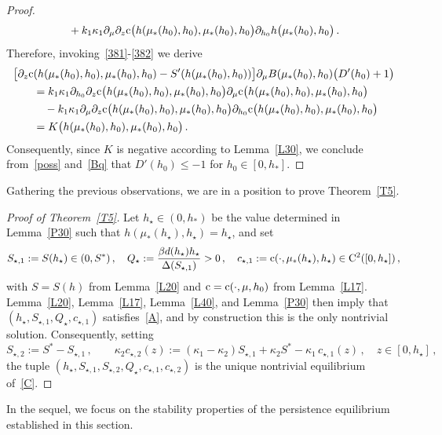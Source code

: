 \documentclass[reqno,11pt]{amsart}
\numberwithin{equation}{section}
\begin{document}
\begin{proof}
\begin{align*}
&\quad +k_1\kappa_1 \partial_{\mu}\partial_z {\rm c}\big(h(\mu_*(h_0),h_0),\mu_*(h_0),h_0\big) \partial_{h_0} h\big(\mu_*(h_0),h_0\big)\,.
\end{align*}
Therefore, invoking~\eqref{381}-\eqref{382} we derive
\begin{align*}
\big[\partial_z{\rm c}&(h(\mu_*(h_0),h_0),\mu_*(h_0),h_0)-S'(h(\mu_*(h_0),h_0)) \big]\partial_{\mu}B(\mu_*(h_0),h_0)\big(D'(h_0)+1\big)\\
&=k_1\kappa_1 \partial_{h_0}\partial_z {\rm c}\big(h(\mu_*(h_0),h_0),\mu_*(h_0),h_0\big) \partial_{\mu} {\rm c}\big(h(\mu_*(h_0),h_0),\mu_*(h_0),h_0\big)\\
&\quad -k_1\kappa_1 \partial_{\mu}\partial_z {\rm c}\big(h(\mu_*(h_0),h_0),\mu_*(h_0),h_0\big) \partial_{h_0} {\rm c}\big(h(\mu_*(h_0),h_0),\mu_*(h_0),h_0\big)\\
&=K\big(h(\mu_*(h_0),h_0),\mu_*(h_0),h_0\big)\,.
\end{align*}
Consequently, since $K$ is negative according to Lemma~\ref{L30}, we conclude from~\eqref{poss} and~\eqref{Bq} that $D'(h_0)\le -1$ for $h_0\in [0,h_*]$.
\end{proof}

Gathering the previous observations, we are in a position to prove Theorem~\ref{T5}.

\begin{proof}[Proof of Theorem~\ref{T5}]
Let $h_\star\in(0,h_*)$ be the value determined in Lemma~\ref{P30} such that $h(\mu_*(h_\star),h_\star)=h_\star$, and set
$$
S_{\star,1}:=S(h_\star)\in(0,S^*)\,,\quad Q_\star:=\frac{\beta d(h_\star) h_\star}{\Delta(S_{\star,1})} > 0\,, \quad c_{\star,1}:={\rm c}(\cdot,\mu_*(h_\star),h_\star)\in {\rm C}^2([0,h_\star])\,,
$$
with $S=S(h)$ from Lemma~\ref{L20} and ${\rm c}={\rm c}(\cdot,\mu,h_0)$ from Lemma~\ref{L17}. Lemma~\ref{L20}, Lemma~\ref{L17}, Lemma~\ref{L40}, and Lemma~\ref{P30} then imply that $(h_\star,S_{\star,1},Q_\star,c_{\star,1})$ satisfies~\eqref{A}, and by construction this is the only nontrivial solution. Consequently, setting
$$
S_{\star,2}:=S^*-S_{\star,1}\,,\qquad \kappa_2c_{\star,2}(z):=(\kappa_1-\kappa_2)S_{\star,1}+\kappa_2 S^*-\kappa_1\,c_{\star,1}(z)\,,\quad z\in[0,h_\star]\,,
$$
the tuple $(h_\star,S_{\star,1},S_{\star,2},Q_\star,c_{\star,1},c_{\star,2})$ is the unique nontrivial equilibrium of~\eqref{C}.
\end{proof}

In the sequel, we focus on the stability properties of the persistence equilibrium established in this section.
\end{document}
